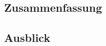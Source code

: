 \lipsum[5]

\subsection{Zusammenfassung}\label{subsec:zusammenfassung}
\lipsum[5]

\subsection{Ausblick}\label{subsec:ausblick}
\lipsum[5]
